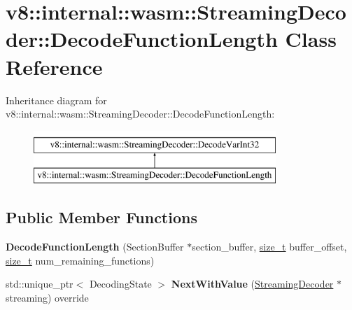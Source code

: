 \hypertarget{classv8_1_1internal_1_1wasm_1_1StreamingDecoder_1_1DecodeFunctionLength}{}\section{v8\+:\+:internal\+:\+:wasm\+:\+:Streaming\+Decoder\+:\+:Decode\+Function\+Length Class Reference}
\label{classv8_1_1internal_1_1wasm_1_1StreamingDecoder_1_1DecodeFunctionLength}
Inheritance diagram for v8\+:\+:internal\+:\+:wasm\+:\+:Streaming\+Decoder\+:\+:Decode\+Function\+Length\+:\begin{figure}[H]
\begin{center}
\leavevmode
\includegraphics[height=2.000000cm]{classv8_1_1internal_1_1wasm_1_1StreamingDecoder_1_1DecodeFunctionLength}
\end{center}
\end{figure}
\subsection*{Public Member Functions}
\begin{DoxyCompactItemize}
\item 
\mbox{\label{classv8_1_1internal_1_1wasm_1_1StreamingDecoder_1_1DecodeFunctionLength_a04bbe62284c4aa7de62b2ba8bdb42f96}} 
{\bfseries Decode\+Function\+Length} (Section\+Buffer $\ast$section\+\_\+buffer, \mbox{\hyperlink{classsize__t}{size\+\_\+t}} buffer\+\_\+offset, \mbox{\hyperlink{classsize__t}{size\+\_\+t}} num\+\_\+remaining\+\_\+functions)
\item 
\mbox{\label{classv8_1_1internal_1_1wasm_1_1StreamingDecoder_1_1DecodeFunctionLength_aadc4f565a6c7004d25c291ee76d8fb03}} 
std\+::unique\+\_\+ptr$<$ Decoding\+State $>$ {\bfseries Next\+With\+Value} (\mbox{\hyperlink{classv8_1_1internal_1_1wasm_1_1StreamingDecoder}{Streaming\+Decoder}} $\ast$streaming) override
\end{DoxyCompactItemize}
